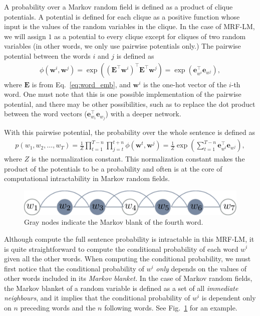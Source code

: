 \documentclass{report}
\newcommand{\vect}[1]{\mathbf{#1}}
\newcommand{\matr}[1]{\mathbf{#1}}
\newcommand{\ve}[0]{\vect{e}}
\newcommand{\vw}[0]{\vect{w}}
\newcommand{\mE}[0]{\matr{E}}
\begin{document}
A probability over a Markov random field is defined as a product of clique
potentials. A potential is defined for each clique as a positive function whose
input is the values of the random variables in the clique. In the case of
MRF-LM, we will assign $1$ as a potential to every clique except for cliques of
two random variables (in other words, we only use pairwise potentials only.) The
pairwise potential between the words $i$ and $j$ is defined as
\begin{align*}
    \phi(\vw^i, \vw^j) = \exp\left( (\mE^\top \vw^{i})^\top  \mE^\top \vw^j\right) = 
    \exp\left( \ve_{w^i}^\top \ve_{w^j} \right),
\end{align*}
where $\mE$ is from Eq.~\eqref{eq:word_emb}, and $\vw^i$ is the one-hot
vector of the $i$-th word. One must note that this is one possible
implementation of the pairwise potential, and there may be other possibilities,
such as to replace the dot product between the word vectors ($\ve_{w_i}^\top
\ve_{w_j}$) with a deeper network.

With this pairwise potential, the probability over the whole sentence is defined
as
\begin{align*}
    p(w_1, w_2, \ldots, w_T) = \frac{1}{Z} \prod_{t=1}^{T-n} \prod_{j=t}^{t+n}
    \phi(\vw^t, \vw^j) = \frac{1}{Z} \exp\left( 
        \sum_{t=1}^{T-n} \ve_{w^t}^\top \ve_{w^j}
    \right),
\end{align*}
where $Z$ is the normalization constant. This normalization constant makes the
product of the potentials to be a probability and often is at the core of
computational intractability in Markov random fields.

\begin{figure}[ht]
    \centering
    \includegraphics[width=\textwidth]{figures/mrflm_mblanket.pdf}
    \caption{Gray nodes indicate the Markov blank of the fourth word.}
    \label{fig:mrf_lm_mblanket}
\end{figure}

Although compute the full sentence probability is intractable in this MRF-LM, it
is quite straightforward to compute the conditional probability of each word
$w^i$ given all the other words. When computing the conditional probability, we
must first notice that the conditional probability of $w^i$ {\em only} depends
on the values of other words included in its {\em Markov blanket.} In the case
of Markov random fields, the Markov blanket of a random variable is defined as a
set of all {\em immediate neighbours}, and it implies that the conditional
probability of $w^i$ is dependent only on $n$ preceding words and the $n$
following words. See Fig.~\ref{fig:mrf_lm_mblanket} for an example.
\end{document}
